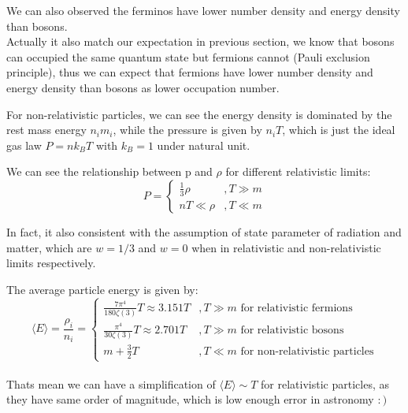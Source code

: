 \bigskip\noindent
\begin{intuition}
    We can also observed the ferminos have lower number density and energy density than bosons. \\
    
    Actually it also match our expectation in previous section, we know that bosons can occupied the same quantum state but fermions cannot (Pauli exclusion principle), thus we can expect that fermions have lower number density and energy density than bosons as lower occupation number.
\end{intuition}

\bigskip\noindent
\begin{intuition}
    For non-relativistic particles, we can see the energy density is dominated by the rest mass energy $n_i m_i$, while the pressure is given by $n_i T$, which is just the ideal gas law $P = n k_B T$ with $k_B = 1$ under natural unit.\\
\end{intuition}

\bigskip\noindent
\begin{theory}
    We can see the relationship between p and $\rho$ for different relativistic limits:
    \[
        P = \begin{cases}
            \frac{1}{3}\rho & ,T \gg m \\
            nT \ll \rho & ,T \ll m
        \end{cases}
    \]

    In fact, it also consistent with the assumption of state parameter of radiation and matter, which are $w = 1/3$ and $w = 0$ when in relativistic and non-relativistic limits respectively.
\end{theory}

\bigskip\noindent
\begin{theory}
    The average particle energy is given by:
    \[
        \langle E \rangle = \frac{\rho_i}{n_i} = \begin{cases}
            \frac{7\pi^4}{180\zeta(3)} T \approx 3.151 T & ,T \gg m \text{ for relativistic fermions} \\
            \frac{\pi^4}{30\zeta(3)} T \approx 2.701 T & ,T \gg m \text{ for relativistic bosons} \\
            m + \frac{3}{2}T & ,T \ll m \text{ for non-relativistic particles}
        \end{cases}
    \]\\

    Thats mean we can have a simplification  of $\langle E \rangle \sim T$ for relativistic particles, as they have same order of magnitude, which is low enough error in astronomy $:)$
\end{theory}


